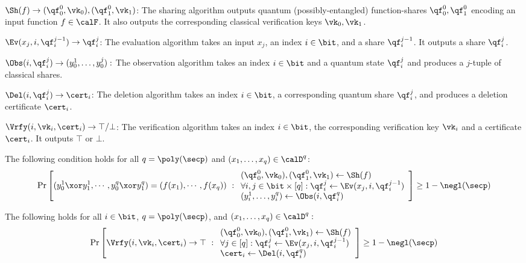 \begin{description}

\item [Syntax:] $ $
\item $\Sh(f) \rightarrow (\qf_0^0, \vk_0), (\qf_1^0,
\vk_1)$: The sharing algorithm outputs quantum
(possibly-entangled) function-shares $\qf_0^0, \qf_1^0$ encoding an
input function $f\in\calF$. It also outputs the corresponding
classical verification keys $\vk_0, \vk_1$.

\item $\Ev(x_j, i, \qf_i^{j-1}) \rightarrow \qf_i^{j}$: The
evaluation algorithm takes an input $x_j$, an index $i \in \bit$,
and a share $\qf_i^{j-1}$. It outputs a share $\qf_i^j$.

\item $\Obs(i, \qf_i^j) \rightarrow (y_0^1, \ldots, y_0^j):$ The
observation algorithm takes an index $i \in \bit$ and a quantum
state $\qf_i^j$ and produces a $j$-tuple of classical shares.

\item $\Del(i, \qf_i^j) \rightarrow \cert_i$: The deletion
algorithm takes an index $i \in \bit$, a corresponding quantum share
$\qf_i^j$, and produces a deletion certificate $\cert_i$.

\item $\Vrfy(i, \vk_i, \cert_i) \rightarrow \top/\bot$: The
verification algorithm takes an index $i \in \bit$, the
corresponding verification key $\vk_i$ and a certificate $\cert_i$.
It outputs $\top$ or $\bot$.

\item [Evaluation Correctness:] The following
condition holds for all $q = \poly(\secp)$ and $(x_1, \ldots, x_q)
\in \calD^{q}$:
\begin{align}
\Pr\left[
(y_0^1 \xor y_1^1, \cdots, y_0^q \xor y_1^q) = (f(x_1), \cdots,
f(x_q))
\ :
\begin{array}{ll}
(\qf_0^0, \vk_0), (\qf_1^0, \vk_1) \gets \Sh(f)\\
\forall i,j \in \bit \times [q]: \qf_i^j
\leftarrow \Ev(x_j, i,
\qf_i^{j-1})\\
(y_i^1, \ldots, y_i^q) \leftarrow \Obs(i, \qf_i^q)
\end{array}
\right] \geq 1 - \negl(\secp)
\end{align}

\item [Delete-before-Observe Correctness:] The following
holds for all $i \in \bit$, $q = \poly(\secp)$, and $(x_1, \ldots,
x_q) \in \calD^q:$
\begin{align}
\Pr\left[
\Vrfy(i, \vk_i, \cert_i) \rightarrow \top
\ :
\begin{array}{ll}
(\qf_0^0, \vk_0), (\qf_1^0, \vk_1) \gets \Sh(f)\\
\forall j \in [q]: \qf_i^j \leftarrow \Ev(x_j, i,
\qf_i^{j-1})\\
\cert_i \leftarrow \Del(i, \qf_i^q)
\end{array}
\right] \geq 1 - \negl(\secp)
\end{align}
\end{description}


